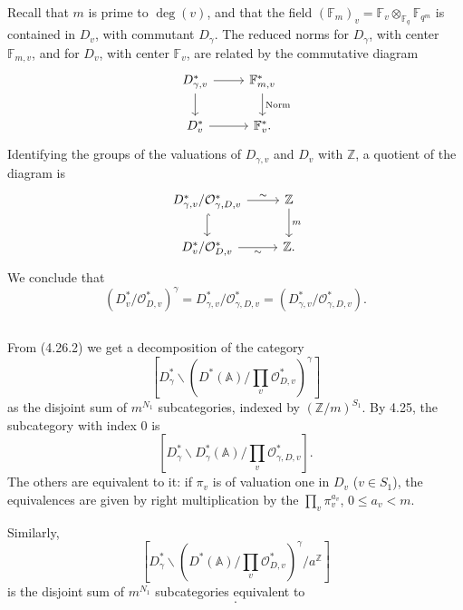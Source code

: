 \documentclass[11pt,a4paper]{article}
\theoremstyle{plain}
\theoremstyle{definition}
\DeclareMathOperator{\Norm}{Norm}
\newcommand{\Fq}{\mathbb{F}_q}
\newcommand{\F}{\mathbb{F}}
\newcommand{\Z}{\mathbb{Z}}
\begin{document}
Recall that $m$ is prime to $\deg(v)$, and that the field $(\mathbb{F}_m)_v = \mathbb{F}_v \otimes_{\Fq} \F_{q^m}$ is contained in $D_v$, with commutant $D_\gamma$. The reduced norms for $D_\gamma$, with center $\mathbb{F}_{m,v}$, and for $D_v$, with center $\mathbb{F}_v$, are related by the commutative diagram
\begin{equation}
\begin{tikzcd}
D_{\gamma,v}^* \arrow[r] \arrow[d] & \mathbb{F}_{m,v}^* \arrow[d, "\Norm"] \\
D_v^* \arrow[r] & \mathbb{F}_v^*.
\end{tikzcd}
\end{equation}
Identifying the groups of the valuations of $D_{\gamma,v}$ and $D_v$ with $\Z$, a quotient of the diagram is
\[
\begin{tikzcd}
D_{\gamma,v}^*/\mathcal{O}_{\gamma,D,v}^* \arrow[r, "\sim"] \arrow[d, hook] & \Z \arrow[d, "m"] \\
D_v^*/\mathcal{O}_{D,v}^* \arrow[r, "\sim"'] & \Z.
\end{tikzcd}
\]
We conclude that
\begin{equation}
(D_v^*/\mathcal{O}_{D,v}^*)^\gamma = D_{\gamma,v}^*/\mathcal{O}_{\gamma,D,v}^* = (D_{\gamma,v}^*/\mathcal{O}_{\gamma,D,v}^*). \tag{4.26.2}
\end{equation}

\subsection{}

From (4.26.2) we get a decomposition of the category
\[
[D_\gamma^* \backslash (D^*(\mathbb{A}) / \prod_v \mathcal{O}_{D,v}^*)^\gamma]
\]
as the disjoint sum of $m^{N_1}$ subcategories, indexed by $(\Z/m)^{S_1}$. By 4.25, the subcategory with index $0$ is
\[
[D_\gamma^* \backslash D_\gamma^*(\mathbb{A}) / \prod_v \mathcal{O}_{\gamma,D,v}^*].
\]
The others are equivalent to it: if $\pi_v$ is of valuation one in $D_v$ ($v \in S_1$), the equivalences are given by right multiplication by the $\prod_v \pi_v^{a_v}$, $0 \leq a_v < m$.

Similarly,
\[
[D_\gamma^* \backslash (D^*(\mathbb{A}) / \prod_v \mathcal{O}_{D,v}^*)^\gamma / a^{\Z}]
\]
is the disjoint sum of $m^{N_1}$ subcategories equivalent to
\begin{equation}
[D_\gamma^* \backslash D_\gamma^*(\mathbb{A}) / \prod_v \mathcal{O}_{\gamma,D,v}^* \cdot a^{\Z}]. \tag{4.27.1}
\end{equation}
\end{document}
